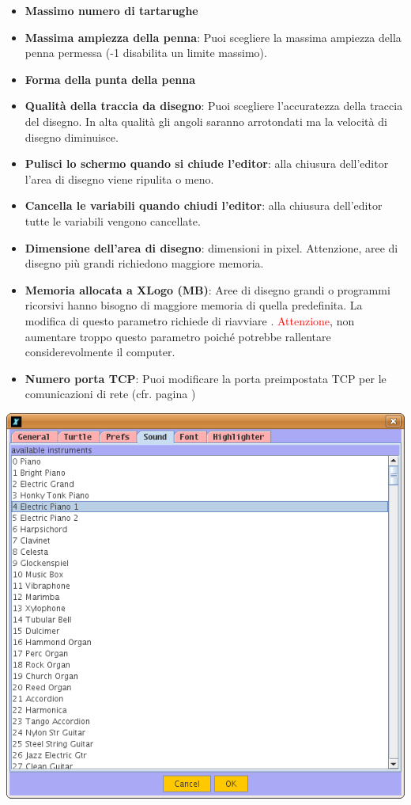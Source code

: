 \begin{itemize}
\begin{itemize}
\begin{itemize}
				\item \textbf{Massimo numero di tartarughe}
				\item \textbf{Massima ampiezza della penna}: Puoi scegliere la massima ampiezza della penna permessa (-1 disabilita un limite massimo).
				\item \textbf{Forma della punta della penna}
				\item \textbf{Qualità della traccia da disegno}: Puoi scegliere l'accuratezza della traccia del disegno. In alta qualità gli angoli saranno arrotondati ma la velocità di disegno diminuisce.
				\item \textbf{Pulisci lo schermo quando si chiude l'editor}: alla chiusura dell'editor l'area di disegno viene ripulita o meno.
				\item \textbf{Cancella le variabili quando chiudi l'editor}: alla chiusura dell'editor tutte le variabili vengono cancellate.
				\item \textbf{Dimensione dell'area di disegno}: dimensioni in pixel. Attenzione, aree di disegno più grandi richiedono maggiore memoria.
				\item \textbf{Memoria allocata a XLogo (MB)}: Aree di disegno grandi o programmi ricorsivi hanno bisogno di maggiore memoria di quella predefinita. La modifica di questo parametro richiede di riavviare \xlogo. \textcolor{red}{Attenzione}, non aumentare troppo questo parametro poiché potrebbe rallentare considerevolmente il computer.
				\item \textbf{Numero porta TCP}: Puoi modificare la porta preimpostata TCP per le comunicazioni di rete (cfr. pagina \pageref{network})
			\end{itemize}
			\begin{center}
				\includegraphics[scale=0.4]{pics/interface-CapturePref4.png}

\end{center}
\end{itemize}
\end{itemize}
